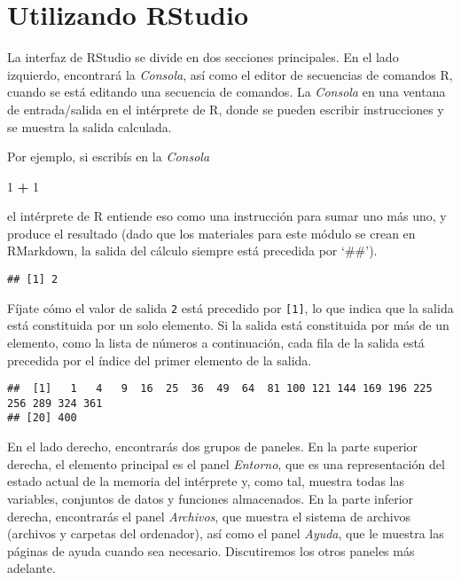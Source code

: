 \documentclass[
]{book}
\newenvironment{Shaded}{\begin{snugshade}}{\end{snugshade}}
\newcommand{\DecValTok}[1]{\textcolor[rgb]{0.00,0.00,0.81}{#1}}
\newcommand{\OperatorTok}[1]{\textcolor[rgb]{0.81,0.36,0.00}{\textbf{#1}}}
\newcommand{\StringTok}[1]{\textcolor[rgb]{0.31,0.60,0.02}{#1}}
\begin{document}
\hypertarget{utilizando-rstudio}{%
\section{Utilizando RStudio}\label{utilizando-rstudio}}

La interfaz de RStudio se divide en dos secciones principales. En el lado izquierdo, encontrará la \emph{Consola}, así como el editor de secuencias de comandos R, cuando se está editando una secuencia de comandos. La \emph{Consola} en una ventana de entrada/salida en el intérprete de R, donde se pueden escribir instrucciones y se muestra la salida calculada.

Por ejemplo, si escribís en la \emph{Consola}

\begin{Shaded}
\begin{Highlighting}[]
\DecValTok{1} \OperatorTok{+}\StringTok{ }\DecValTok{1}
\end{Highlighting}
\end{Shaded}

el intérprete de R entiende eso como una instrucción para sumar uno más uno, y produce el resultado (dado que los materiales para este módulo se crean en RMarkdown, la salida del cálculo siempre está precedida por `\#\#').

\begin{verbatim}
## [1] 2
\end{verbatim}

Fíjate cómo el valor de salida \texttt{2} está precedido por \texttt{{[}1{]}}, lo que indica que la salida está constituida por un solo elemento. Si la salida está constituida por más de un elemento, como la lista de números a continuación, cada fila de la salida está precedida por el índice del primer elemento de la salida.

\begin{verbatim}
##  [1]   1   4   9  16  25  36  49  64  81 100 121 144 169 196 225 256 289 324 361
## [20] 400
\end{verbatim}

En el lado derecho, encontrarás dos grupos de paneles. En la parte superior derecha, el elemento principal es el panel \emph{Entorno}, que es una representación del estado actual de la memoria del intérprete y, como tal, muestra todas las variables, conjuntos de datos y funciones almacenados. En la parte inferior derecha, encontrarás el panel \emph{Archivos}, que muestra el sistema de archivos (archivos y carpetas del ordenador), así como el panel \emph{Ayuda}, que le muestra las páginas de ayuda cuando sea necesario. Discutiremos los otros paneles más adelante.
\end{document}
